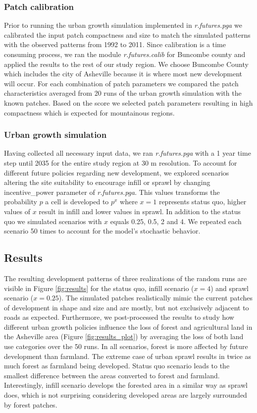 \documentclass{isprs}
\begin{document}
\subsubsection{Patch calibration}
Prior to running the urban growth simulation implemented in \emph{r.futures.pga}
we calibrated the input patch compactness and size to match
the simulated patterns with the observed patterns from 1992 to 2011.
Since calibration is a time consuming process, we ran the module
\emph{r.futures.calib} for Buncombe county 
and applied the results to the rest of our study region.
We choose Buncombe County which includes the city of Asheville  because it is where most new development will occur.
For each combination of patch parameters we compared the patch characteristics 
averaged from 20 runs of the urban growth simulation with the known patches.
Based on the score we selected patch parameters resulting in high compactness
which is expected for mountainous regions.


\subsubsection{Urban growth simulation}
Having collected all necessary input data, we ran 
\emph{r.futures.pga} with a 1 year time step until 2035 for the entire study region at 30 m resolution.
To account for different future policies regarding new development, we explored
scenarios altering the site suitability to encourage infill or sprawl by changing
incentive\_power parameter of \emph{r.futures.pga}. This values transforms
the probability $p$ a cell is developed to $p^x$ where $x = 1$ represents status quo,
higher values of $x$ result in infill and lower values in sprawl.
In addition to the status quo we simulated scenarios with $x$ equals 0.25, 0.5, 2 and 4.
We repeated each scenario 50 times to account for the model's stochastic behavior.



\subsection{Results}
The resulting development patterns of three realizations of the random runs
are visible in Figure \ref{fig:results}
for the status quo, infill scenario ($x = 4$) and sprawl scenario ($x=0.25$).
The simulated patches realistically mimic the current patches of development in shape and size
and are mostly, but not exclusively adjacent to roads as expected.
Furthermore, we post-processed the results to study how different urban growth policies
influence the loss of forest and agricultural land in the Asheville area
(Figure \ref{fig:results_plot})
by averaging the loss of both land use categories over the 50 runs.
In all scenarios, forest is more affected by future development than farmland.
The extreme case of urban sprawl results in twice as much forest as farmland being developed.
Status quo scenario leads to the smallest difference between the areas converted to forest and farmland.
Interestingly, infill scenario develops the forested area in a similar way as sprawl does, which 
is not surprising considering developed areas are largely surrounded by forest patches.
\end{document}
